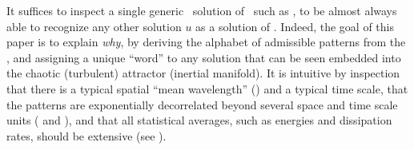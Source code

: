 It suffices to inspect a single generic \spt\ solution of \KSe\, such as
, to be almost always able to recognize any other solution $u$ as
a solution of \KSe.
Indeed, the goal of this paper is to explain \emph{why}, by deriving the
alphabet of admissible patterns from the \KSe, and assigning a unique
{\spt} ``word'' to any solution that can be seen embedded into
the chaotic (turbulent) attractor (inertial manifold).
It is intuitive by inspection that there is a typical spatial ``mean
wavelength'' () and a typical time scale, that
the patterns are exponentially decorrelated beyond several space and time
scale units ( and ),
and that all statistical averages, such as energies
and dissipation rates, should be extensive (see ).
